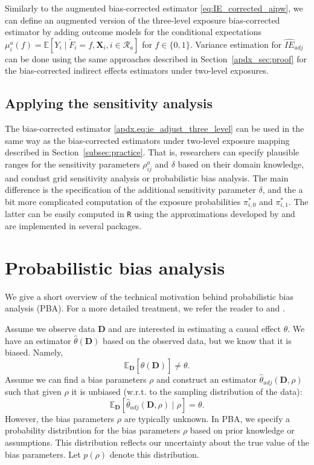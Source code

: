 \documentclass[11pt]{article}
\theoremstyle{definition}
\def \bX {\boldsymbol{X}}
\def \bD {\boldsymbol{D}}
\def \cR {\mathcal{R}}
\def \EX {\mathbb{E}}
\begin{document}
Similarly to the augmented bias-corrected estimator \eqref{eq:IE_corrected_aipw},
we can define an augmented version of the three-level exposure bias-corrected estimator
by adding outcome models for the conditional expectations
$\mu_i^a(f) = \EX \left[Y_i \mid \widetilde{F}_i = f, \bX_i, i \in \cR_a \right]$ for $f \in \{0,1\}$.
Variance estimation for $\widehat{IE}_{adj}$ can be done using
the same approaches described in Section~\ref{apdx_sec:proof} for the bias-corrected 
indirect effects estimators under two-level exposures.

\subsection*{Applying the sensitivity analysis}
The bias-corrected estimator \eqref{apdx.eq:ie_adjust_three_level}
can be used in the same way as the bias-corrected estimators 
under two-level exposure mapping described in Section~\ref{subsec:practice}.
That is, researchers can specify plausible ranges for the sensitivity parameters
$\rho^a_{ij}$ and $\delta$ based on their domain knowledge,
and condust grid sensitivity analysis or probabilistic bias analysis.
The main difference is the specification of the additional sensitivity parameter $\delta$,
and the a bit more complicated computation of the exposure probabilities $\pi_{i,0}^*$ and $\pi_{i,1}^*$.
The latter can be easily computed in \texttt{R} using the approximations 
developed by \citet{hong2013} and are implemented in several packages.

\section{Probabilistic bias analysis}
\label{apdx.sec:pba}
We give a short overview of the technical motivation behind probabilistic bias analysis (PBA).
For a more detailed treatment, we refer the reader to \citet{Greenland2005} and \citet{Fox2021}.

Assume we observe data $\bD$ and are interested in estimating a causal effect $\theta$.
We have an estimator $\widehat{\theta}(\bD)$ based on the observed data, but we know that it is biased.
Namely, 
\begin{equation*}
    \EX_{\bD}\left[\widehat{\theta}(\bD)\right] \neq \theta.
\end{equation*}
Assume we can find a bias parameters $\rho$ and construct an estimator
$\widehat{\theta}_{adj}(\bD, \rho)$ such that given $\rho$
 it is unbiased (w.r.t. to the sampling distribution of the data):
\begin{equation*}
    \EX_{\bD}\left[\widehat{\theta}_{adj}(\bD, \rho)\mid \rho \right] = \theta.
\end{equation*}
However, the bias parameters $\rho$ are typically unknown.
In PBA, we specify a probability distribution for the bias parameters $\rho$ based on prior knowledge or assumptions.
This distribution reflects our uncertainty about the true value of the bias parameters.
Let $p(\rho)$ denote this distribution.
\end{document}
